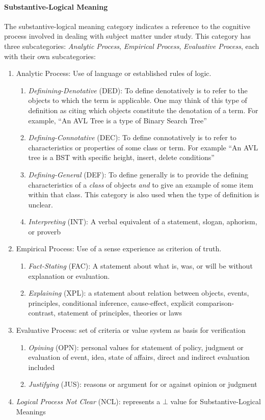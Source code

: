 \documentclass[conference]{IEEEtran}
\begin{document}
\paragraph{Substantive-Logical Meaning}
The substantive-logical meaning
category indicates a reference to the cognitive process involved
in dealing with subject matter under study. This category has three
subcategories: \emph{Analytic Process}, \emph{Empirical Process},
\emph{Evaluative Process}, each with their own subcategories:
\begin{enumerate}
  \item{Analytic Process}: Use of language or established rules of logic.
  \begin{enumerate}
    \item \emph{Definining-Denotative} (DED): To define denotatively is to
      refer to the objects to which the term is applicable. One may think of
      this type of definition as citing which objects constitute the
      denotation of a term. For example, ``An AVL Tree is a type of Binary
      Search Tree''
    \item \emph{Defining-Connotative} (DEC): To define connotatively is to
      refer to characteristics or properties of some class or term. For example ``An
      AVL tree is a BST with specific height, insert, delete conditions''
    \item \emph{Defining-General} (DEF): To define generally is to provide the
      defining characteristics of a \emph{class} of objects \emph{and} to give
      an example of some item within that class. This category is also used
      when the type of definition is unclear.
    \item \emph{Interpreting} (INT): A verbal equivalent of a statement, slogan, aphorism, or proverb
  \end{enumerate}
  \item{Empirical Process}: Use of a sense experience as criterion of truth.
  \begin{enumerate}
    \item \emph{Fact-Stating} (FAC): A statement about what is, was, or will be without explanation or evaluation.
    \item \emph{Explaining} (XPL): a statement about relation between objects, events, principles, conditional inference, cause-effect, explicit comparison-contrast, statement of principles, theories or laws
    \end{enumerate}
  \item{Evaluative Process}: set of criteria or value system as basis for verification
    \begin{enumerate}
      \item \emph{Opining} (OPN): personal values for statement of policy, judgment or evaluation of event, idea, state of affairs, direct and indirect evaluation included
      \item \emph{Justifying} (JUS): reasons or argument for or against opinion or judgment
    \end{enumerate}
  \item \emph{Logical Process Not Clear} (NCL): represents a $\bot$ value for Substantive-Logical Meanings
  \end{enumerate}
\end{document}
